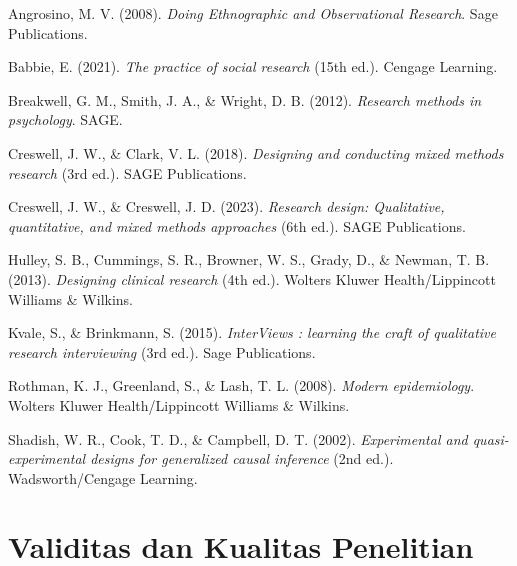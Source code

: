 \documentclass[
  indonesian,
  letterpaper,
  DIV=11,
  numbers=noendperiod]{scrreprt}
\newlength{\cslhangindent}
\newenvironment{CSLReferences}[2] %
 {\begin{list}{}{%
  \setlength{\itemindent}{0pt}
  \setlength{\leftmargin}{0pt}
  \setlength{\parsep}{0pt}
  \ifodd #1
   \setlength{\leftmargin}{\cslhangindent}
   \setlength{\itemindent}{-1\cslhangindent}
  \fi
  \setlength{\itemsep}{#2\baselineskip}}}
 {\end{list}}
\begin{document}
\label{refs--5}
\begin{CSLReferences}{1}{0}
Angrosino, M. V. (2008). \emph{Doing Ethnographic and Observational
Research}. Sage Publications.

Babbie, E. (2021). \emph{The practice of social research} (15th ed.).
Cengage Learning.

Breakwell, G. M., Smith, J. A., \& Wright, D. B. (2012). \emph{Research
methods in psychology}. SAGE.

Creswell, J. W., \& Clark, V. L. (2018). \emph{Designing and conducting
mixed methods research} (3rd ed.). SAGE Publications.

Creswell, J. W., \& Creswell, J. D. (2023). \emph{Research design:
Qualitative, quantitative, and mixed methods approaches} (6th ed.). SAGE
Publications.

Hulley, S. B., Cummings, S. R., Browner, W. S., Grady, D., \& Newman, T.
B. (2013). \emph{Designing clinical research} (4th ed.). Wolters Kluwer
Health/Lippincott Williams \& Wilkins.

Kvale, S., \& Brinkmann, S. (2015). \emph{InterViews : learning the
craft of qualitative research interviewing} (3rd ed.). Sage
Publications.

Rothman, K. J., Greenland, S., \& Lash, T. L. (2008). \emph{Modern
epidemiology}. Wolters Kluwer Health/Lippincott Williams \& Wilkins.

Shadish, W. R., Cook, T. D., \& Campbell, D. T. (2002).
\emph{Experimental and quasi-experimental designs for generalized causal
inference} (2nd ed.). Wadsworth/Cengage Learning.

\end{CSLReferences}

\chapter{Validitas dan Kualitas
Penelitian}\label{validitas-dan-kualitas-penelitian}
\end{document}
